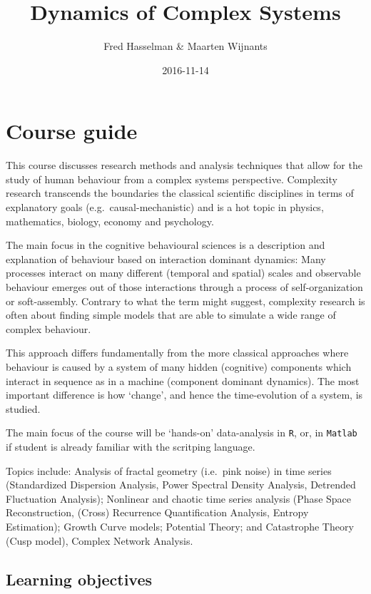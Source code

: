 \documentclass[]{book}
\title{Dynamics of Complex Systems}
\author{Fred Hasselman \& Maarten Wijnants}
\date{2016-11-14}
\let\stdsection\section
\renewcommand\section{\newpage\stdsection}
\begin{document}
\maketitle

{
\setcounter{tocdepth}{1}
\tableofcontents
}
\chapter{\texorpdfstring{\textbf{Course
guide}}{Course guide}}\label{course-guide}

This course discusses research methods and analysis techniques that
allow for the study of human behaviour from a complex systems
perspective. Complexity research transcends the boundaries the classical
scientific disciplines in terms of explanatory goals
(e.g.~causal-mechanistic) and is a hot topic in physics, mathematics,
biology, economy and psychology.

The main focus in the cognitive behavioural sciences is a description
and explanation of behaviour based on interaction dominant dynamics:
Many processes interact on many different (temporal and spatial) scales
and observable behaviour emerges out of those interactions through a
process of self-organization or soft-assembly. Contrary to what the term
might suggest, complexity research is often about finding simple models
that are able to simulate a wide range of complex behaviour.

This approach differs fundamentally from the more classical approaches
where behaviour is caused by a system of many hidden (cognitive)
components which interact in sequence as in a machine (component
dominant dynamics). The most important difference is how `change', and
hence the time-evolution of a system, is studied.

The main focus of the course will be `hands-on' data-analysis in
\texttt{R}, or, in \texttt{Matlab} if student is already familiar with
the scritping language.

Topics include: Analysis of fractal geometry (i.e.~pink noise) in time
series (Standardized Dispersion Analysis, Power Spectral Density
Analysis, Detrended Fluctuation Analysis); Nonlinear and chaotic time
series analysis (Phase Space Reconstruction, (Cross) Recurrence
Quantification Analysis, Entropy Estimation); Growth Curve models;
Potential Theory; and Catastrophe Theory (Cusp model), Complex Network
Analysis.

\section{Learning objectives}\label{learning-objectives}
\end{document}
